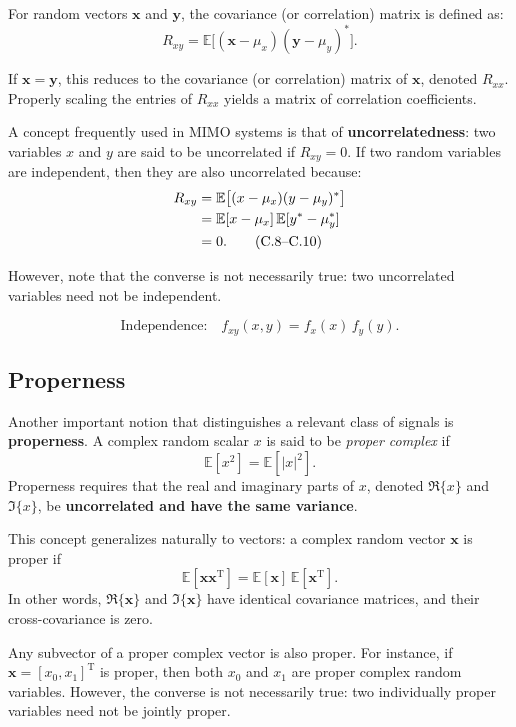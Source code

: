 For random vectors \( \mathbf{x} \) and \( \mathbf{y} \), the covariance (or correlation) matrix is defined as:
\begin{equation}
R_{xy} = \mathbb{E}\big[(\mathbf{x} - \mu_x)(\mathbf{y} - \mu_y)^{*}\big].
\tag{C.7}
\end{equation}

If \( \mathbf{x} = \mathbf{y} \), this reduces to the covariance (or correlation) matrix of \( \mathbf{x} \), denoted \( R_{xx} \).  
Properly scaling the entries of \( R_{xx} \) yields a matrix of correlation coefficients.

A concept frequently used in MIMO systems is that of \textbf{uncorrelatedness}:  
two variables \( x \) and \( y \) are said to be uncorrelated if \( R_{xy} = 0 \).  
If two random variables are independent, then they are also uncorrelated because:
\begin{align}
R_{xy} &= \mathbb{E}\big[(x - \mu_x)(y - \mu_y)^{*}\big] \notag \\
       &= \mathbb{E}[x - \mu_x] \, \mathbb{E}[y^{*} - \mu_y^{*}] \notag \\
       &= 0.
\tag{C.8–C.10}
\end{align}

However, note that the converse is not necessarily true:  
two uncorrelated variables need not be independent.

\[
\text{Independence:} \quad f_{xy}(x,y) = f_x(x) \, f_y(y).
\]

\subsection{Properness}

Another important notion that distinguishes a relevant class of signals is \textbf{properness}.  
A complex random scalar \( x \) is said to be \emph{proper complex} if
\[
\mathbb{E}[x^2] = \mathbb{E}[|x|^2].
\]
Properness requires that the real and imaginary parts of \(x\), denoted \(\Re\{x\}\) and \(\Im\{x\}\), be \textbf{uncorrelated and have the same variance}.  

This concept generalizes naturally to vectors:  
a complex random vector \( \mathbf{x} \) is proper if
\[
\mathbb{E}[\mathbf{x} \mathbf{x}^{\mathrm{T}}] = \mathbb{E}[\mathbf{x}] \, \mathbb{E}[\mathbf{x}^{\mathrm{T}}].
\]
In other words, \( \Re\{\mathbf{x}\} \) and \( \Im\{\mathbf{x}\} \) have identical covariance matrices, and their cross-covariance is zero.  

Any subvector of a proper complex vector is also proper.  
For instance, if \( \mathbf{x} = [x_0, x_1]^{\mathrm{T}} \) is proper, then both \( x_0 \) and \( x_1 \) are proper complex random variables.  
However, the converse is not necessarily true: two individually proper variables need not be jointly proper.

